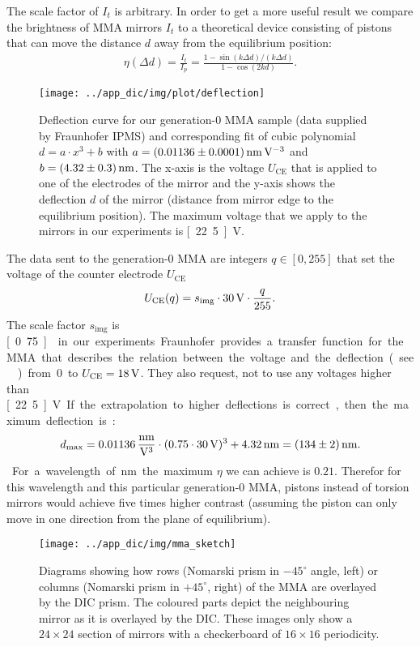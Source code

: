 The scale factor of $I_t$ is arbitrary. In order to get a more useful
result we compare the brightness of MMA mirrors $I_t$ to a theoretical
device consisting of pistons that can move the distance $d$ away from
the equilibrium position:
\begin{align}
\label{eqn:eta}
  \eta(\Delta d)=\frac{I_t}{I_p}=\frac{1-\sin(k\Delta d)/(k\Delta d)}{1-\cos(2kd)}.
\end{align}
\begin{figure}[ht]
  \centering
  \texttt{[image: ../app\_dic/img/plot/deflection]}
  \caption{Deflection curve for our generation-0 MMA sample (data
    supplied by Fraunhofer IPMS) and corresponding fit of cubic
    polynomial $d=a\cdot x^3+b$ with $a=\unit[(0.01136\pm0.0001)]{nm\,
      V^{-3}}$ and $b=\unit[(4.32\pm0.3)]{nm}$. The x-axis is the
    voltage $U_\textrm{CE}$ that is applied to one of the electrodes
    of the mirror and the y-axis shows the deflection $d$ of the
    mirror (distance from mirror edge to the equilibrium
    position). The maximum voltage that we apply to the mirrors in our
    experiments is \unit[22.5]{V}.}
  \label{fig:deflection}
\end{figure}
The data sent to the generation-0 MMA are integers $q\in[0,255]$
that set the voltage of the counter electrode $U_\textrm{CE}$
\begin{align}
U_\textrm{CE}(q)=s_\textrm{img}\cdot \unit[30]{V} \cdot \frac{q}{255}.
\end{align}
The scale factor $s_\textrm{img}$ is \unit[0.75]{} in our experiments.
Fraunhofer provides a transfer function for the MMA that describes the
relation between the voltage and the deflection (see
) from 0 to $U_\textrm{CE}=\unit[18]{V}$. They
also request, not to use any voltages higher than \unit[22.5]{V}. If
the extrapolation to higher deflections is correct, then the maximum
deflection is: %
\begin{align}
\label{eqn:dmax}
d_\textrm{max}=\unit[0.01136]{\frac{nm}{V^3}}\cdot(0.75\cdot\unit[30]{V})^3+\unit[4.32]{nm}
=\unit[(134\pm2)]{nm}.
\end{align}
For a wavelength of \unit[480]{nm} the maximum $\eta$ we can achieve
is $0.21$. Therefor for this wavelength and this particular
generation-0 MMA, pistons instead of torsion mirrors would achieve
five times higher contrast (assuming the piston can only move in one
direction from the plane of equilibrium).
\begin{figure}[ht]
  \centering
  \texttt{[image: ../app\_dic/img/mma\_sketch]}
  \caption{ Diagrams showing how rows (Nomarski prism in $-45^\circ$
    angle, left) or columns (Nomarski prism in $+45^\circ$, right) of
    the MMA are overlayed by the DIC prism. The coloured parts depict
    the neighbouring mirror as it is overlayed by the DIC. These
    images only show a $24\times 24$ section of mirrors with a
    checkerboard of $16\times 16$ periodicity.}
  \label{fig:screen}
\end{figure}
